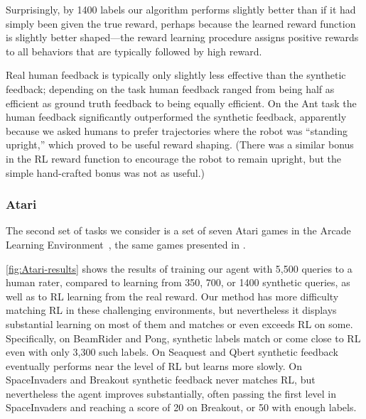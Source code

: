 Surprisingly, by 1400 labels our algorithm performs slightly better than if it had simply been given the true reward, perhaps because the learned reward function is slightly better shaped---the reward learning procedure assigns positive rewards to all behaviors that are typically followed by high reward.

Real human feedback is typically only slightly less effective than the synthetic feedback; depending on the task human feedback ranged from being half as efficient as ground truth feedback to being equally efficient. On the Ant task the human feedback significantly outperformed the synthetic feedback, apparently because we asked humans to prefer trajectories where the robot was ``standing upright,'' which proved to be useful reward shaping. (There was a similar bonus in the RL reward function to encourage the robot to remain upright, but the simple hand-crafted bonus was not as useful.)

\subsubsection{Atari}

The second set of tasks we consider is a set of seven Atari games in the Arcade Learning Environment~\citep{Bellemare13}, the same games presented in \citealp{Mnih13}.

\autoref{fig:Atari-results} shows the results of training our agent with 5,500 queries to a human rater, compared to learning from 350, 700, or 1400 synthetic queries, as well as to RL learning from the real reward. Our method has more difficulty matching RL in these challenging environments, but nevertheless it displays substantial learning on most of them and matches or even exceeds RL on some.  Specifically, on BeamRider and Pong, synthetic labels match or come close to RL even with only 3,300 such labels.  On Seaquest and Qbert synthetic feedback eventually performs near the level of RL but learns more slowly.  On SpaceInvaders and Breakout synthetic feedback never matches RL, but nevertheless the agent improves substantially, often passing the first level in SpaceInvaders and reaching a score of 20 on Breakout, or 50 with enough labels.

